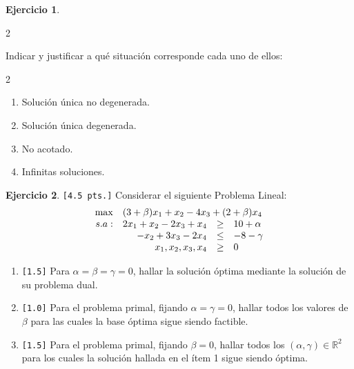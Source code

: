 \documentclass[a4paper,oneside,11pt]{amsart}
\theoremstyle{definition}
\newtheorem{quest}{Ejercicio}
\begin{document}
\begin{quest}
\begin{multicols}{2}
\begin{itemize}
    \end{itemize}
\end{multicols}
Indicar y justificar a qué situación corresponde cada uno de ellos:
\begin{multicols}{2}
\begin{enumerate}[label=\alph*)]
    \item Solución única no degenerada.
    \item Solución única degenerada.
    \item No acotado.
    \item Infinitas soluciones.
\end{enumerate}    
\end{multicols}

\end{quest}



\begin{quest} \verb|[4.5 pts.]| 
    Considerar el siguiente Problema Lineal:
    \[
    \begin{array}{rrcl}
    \max & \multicolumn{3}{l}{(3+\beta)x_1+x_2-4x_3+(2+\beta)x_4} \\
    s.a: & 2x_1+x_2-2x_3+x_4 & \geq & 10+\alpha \\
     & -x_2+3x_3-2x_4 & \leq & -8-\gamma \\
     & x_1, x_2, x_3, x_4 & \geq & 0\\
    \end{array}
    \]
    \begin{enumerate}[label=\alph*)]
        \item\verb|[1.5]| Para $\alpha =\beta=\gamma=0$, hallar la solución óptima mediante la solución de su problema dual.
        \item\verb|[1.0]| Para el problema primal, fijando $\alpha=\gamma=0$, hallar todos los valores de $\beta$ para las cuales la base óptima sigue siendo factible.
        \item\verb|[1.5]| Para el problema primal, fijando $\beta=0$, hallar todos los $(\alpha, \gamma)\in\mathbb{R}^2$ para los cuales la solución hallada en el ítem 1 sigue siendo óptima. 
    \end{enumerate}  
\end{quest}


\end{document}
